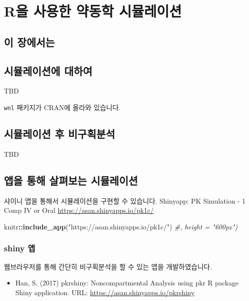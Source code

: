 \documentclass[12pt,]{krantz}
\newenvironment{Shaded}{\begin{snugshade}}{\end{snugshade}}
\newcommand{\CommentTok}[1]{\textcolor[rgb]{0.56,0.35,0.01}{\textit{#1}}}
\newcommand{\KeywordTok}[1]{\textcolor[rgb]{0.13,0.29,0.53}{\textbf{#1}}}
\newcommand{\NormalTok}[1]{#1}
\newcommand{\OperatorTok}[1]{\textcolor[rgb]{0.81,0.36,0.00}{\textbf{#1}}}
\newcommand{\StringTok}[1]{\textcolor[rgb]{0.31,0.60,0.02}{#1}}
\providecommand{\tightlist}{%
  \setlength{\itemsep}{0pt}\setlength{\parskip}{0pt}}
\begin{document}
\hypertarget{rsimulation}{%
\chapter{R을 사용한 약동학 시뮬레이션}\label{rsimulation}}

\hypertarget{summary-simulation}{%
\section{이 장에서는}\label{summary-simulation}}

\hypertarget{sim-about}{%
\section{시뮬레이션에 대하여}\label{sim-about}}

TBD

\texttt{wnl} 패키지가 CRAN에 올라와 있습니다.

\hypertarget{sim-nca}{%
\section{시뮬레이션 후 비구획분석}\label{sim-nca}}

TBD

\hypertarget{sim-app}{%
\section{앱을 통해 살펴보는 시뮬레이션}\label{sim-app}}

샤이니 앱을 통해서 시뮬레이션을 구현할 수 있습니다. Shinyapp: PK Simulation - 1 Comp IV or Oral \url{https://asan.shinyapps.io/pk1c/}

\begin{Shaded}
\begin{Highlighting}[]
\NormalTok{knitr}\OperatorTok{::}\KeywordTok{include_app}\NormalTok{(}\StringTok{"https://asan.shinyapps.io/pk1c/"}\NormalTok{) }\CommentTok{#, height = "600px")}
\end{Highlighting}
\end{Shaded}

\hypertarget{shiny}{%
\subsection{shiny 앱}\label{shiny}}

웹브라우저를 통해 간단히 비구획분석을 할 수 있는 앱을 개발하였습니다.

\begin{itemize}
\tightlist
\item
  Han, S. (2017) pkrshiny: Noncompartmental Analysis using pkr R package Shiny application. URL: \url{https://asan.shinyapps.io/pkrshiny}
\end{itemize}
\end{document}
